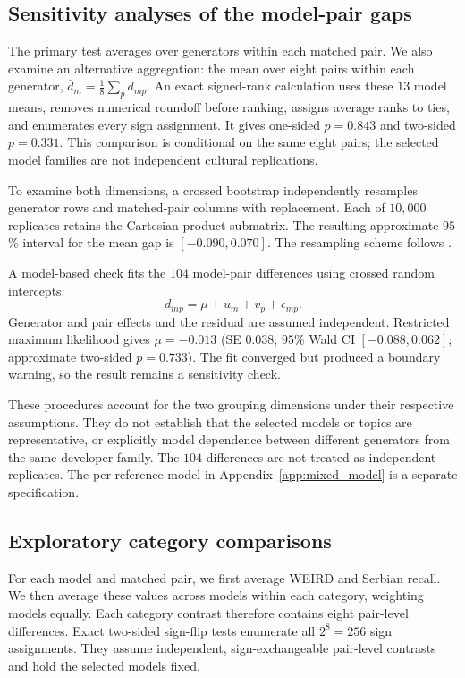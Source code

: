\documentclass[11pt,a4paper]{article}
\begin{document}
\subsection{Sensitivity analyses of the model-pair gaps}
\label{app:gap-sensitivity}
The primary test averages over generators within each matched pair. We also examine an alternative aggregation: the mean over eight pairs within each generator, $\overline d_m=\frac18\sum_p d_{mp}$. An exact signed-rank calculation uses these $13$ model means, removes numerical roundoff before ranking, assigns average ranks to ties, and enumerates every sign assignment. It gives one-sided $p=0.843$ and two-sided $p=0.331$. This comparison is conditional on the same eight pairs; the selected model families are not independent cultural replications.

To examine both dimensions, a crossed bootstrap independently resamples generator rows and matched-pair columns with replacement. Each of $10{,}000$ replicates retains the Cartesian-product submatrix. The resulting approximate $95$\% interval for the mean gap is $[-0.090,0.070]$. The resampling scheme follows \citet{owen2007pigeonhole}.

A model-based check fits the $104$ model-pair differences using crossed random intercepts:
\begin{equation}
d_{mp}=\mu+u_m+v_p+\epsilon_{mp}.
\label{eq:crossed}
\end{equation}
Generator and pair effects and the residual are assumed independent. Restricted maximum likelihood gives $\mu=-0.013$ (SE $0.038$; $95$\% Wald CI $[-0.088,0.062]$; approximate two-sided $p=0.733$). The fit converged but produced a boundary warning, so the result remains a sensitivity check.

These procedures account for the two grouping dimensions under their respective assumptions. They do not establish that the selected models or topics are representative, or explicitly model dependence between different generators from the same developer family. The $104$ differences are not treated as independent replicates. The per-reference model in Appendix~\ref{app:mixed_model} is a separate specification.

\subsection{Exploratory category comparisons}
\label{app:category-tests}
For each model and matched pair, we first average WEIRD and Serbian recall. We then average these values across models within each category, weighting models equally. Each category contrast therefore contains eight pair-level differences. Exact two-sided sign-flip tests enumerate all $2^8=256$ sign assignments. They assume independent, sign-exchangeable pair-level contrasts and hold the selected models fixed.
\end{document}
